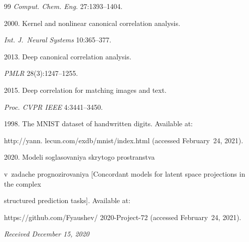 {{\begin{thebibliography}{99}
 \textit{Comput. Chem. Eng.} 27:1393--1404.




 2000. Kernel and nonlinear canonical correlation analysis. 

\textit{Int. J.~Neural Systems} 10:365--377.







 2013. Deep canonical correlation analysis. 

 \textit{PMLR} 28(3):1247--1255.




 2015. Deep correlation for matching images and text. 

\textit{Proc. CVPR IEEE} 4:3441--3450.





 1998. The MNIST dataset of handwritten digits. Available at: 

 {\sf http://yann. lecun.com/exdb/mnist/index.html} (accessed February~24, 2021).




 2020. Modeli soglasovaniya skrytogo prostranstva 

v~zadache prognozirovaniya [Concordant models for latent space projections in the complex

 structured prediction tasks]. Available at: 

 {\sf https://github.com/Fyaushev/ 2020-Project-72} (accessed February~24, 2021).

 \end{thebibliography}

} }



\vspace*{-3pt}



\hfill{\small\textit{Received December 15, 2020}} 






